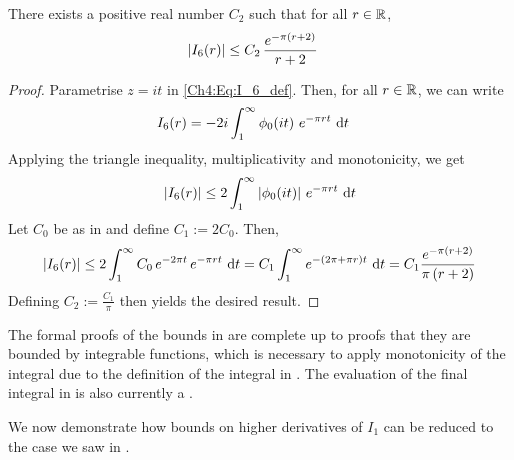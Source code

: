 \begin{boxlemma}\label{Ch4:Lemma:Bound_I6}
    There exists a positive real number $C_2$ such that for all $r \in \mathbb{R}$,
    \begin{align*}
        \left\lvert I_6(r) \right\rvert &\leq C_2 \, \frac{e^{-\pi \left( r + 2 \right)}}{r + 2}
    \end{align*}
\end{boxlemma}
\begin{proof}
    Parametrise $z = it$ in \eqref{Ch4:Eq:I_6_def}. Then, for all $r \in \mathbb{R}$, we can write
    \begin{align*}
        I_6(r) &= -2i \int_{1}^{\infty} \phi_0\!\left( it \right) \, e^{- \pi r t} \, \operatorname{d}\!{t}
    \end{align*}
    Applying the triangle inequality, multiplicativity and monotonicity, we get
    \begin{align*}
        \left\lvert I_6(r) \right\rvert \leq 2\int_{1}^{\infty}
            \left\lvert \phi_0\!\left( it \right) \right\rvert \,
            e^{-\pi r t} \,
            \operatorname{d}\!{t}
    \end{align*}
    Let $C_0$ be as in  and define $C_1 := 2 C_0$. Then,
    \begin{align*}
        \left\lvert I_6(r) \right\rvert \leq 2\int_{1}^{\infty}
            C_0 \,
            e^{-2 \pi t} \,
            e^{-\pi r t} \,
            \operatorname{d}\!{t}
        = C_1 \int_{1}^{\infty} e^{-\left( 2\pi + \pi r \right)t} \, \operatorname{d}\!{t}
        = C_1 \frac{e^{-\pi\left( r + 2 \right)}}{\pi\left( r + 2 \right)}
    \end{align*}
    Defining $C_2 := \frac{C_1}{\pi}$ then yields the desired result.
\end{proof}

The formal proofs of the bounds in  are complete up to proofs that they are bounded by integrable functions, which is necessary to apply monotonicity of the integral due to the definition of the integral in \mathlib. The evaluation of the final integral in  is also currently a \sorry.

We now demonstrate how bounds on higher derivatives of $I_1$ can be reduced to the case we saw in .

